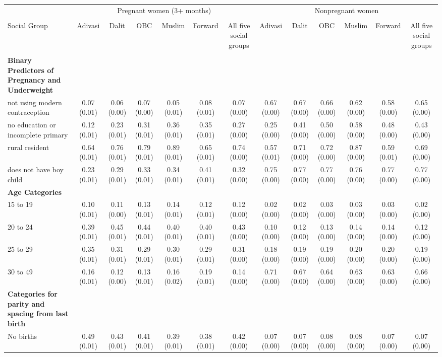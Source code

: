 \begin{tabular}{l*{12}{c}}
\toprule
& \multicolumn{6}{c}{Pregnant women (3+ months)} & \multicolumn{6}{c}{Nonpregnant women} \\\\
\cmidrule(lr){2-7} \cmidrule(lr){8-13}
Social Group & Adivasi & Dalit & OBC & Muslim & Forward & All five social groups & Adivasi & Dalit & OBC & Muslim & Forward & All five social groups \\\\
\midrule
\textbf{Binary Predictors of Pregnancy and Underweight}&&&&&&&&&&&&\\
not using modern contraception&0.07 (0.01)&0.06 (0.00)&0.07 (0.00)&0.05 (0.01)&0.08 (0.01)&0.07 (0.00)&0.67 (0.00)&0.67 (0.00)&0.66 (0.00)&0.62 (0.00)&0.58 (0.00)&0.65 (0.00)\\
no education or incomplete primary&0.12 (0.01)&0.23 (0.01)&0.31 (0.01)&0.36 (0.01)&0.35 (0.01)&0.27 (0.00)&0.25 (0.00)&0.41 (0.00)&0.50 (0.00)&0.58 (0.00)&0.48 (0.00)&0.43 (0.00)\\
rural resident&0.64 (0.01)&0.76 (0.01)&0.79 (0.01)&0.89 (0.01)&0.65 (0.01)&0.74 (0.00)&0.57 (0.01)&0.71 (0.00)&0.72 (0.00)&0.87 (0.00)&0.59 (0.01)&0.69 (0.00)\\
does not have boy child&0.23 (0.01)&0.29 (0.01)&0.33 (0.01)&0.34 (0.01)&0.41 (0.01)&0.32 (0.00)&0.75 (0.00)&0.77 (0.00)&0.77 (0.00)&0.76 (0.00)&0.77 (0.00)&0.77 (0.00)\\
\textbf{Age Categories}&&&&&&&&&&&&\\
15 to 19&0.10 (0.01)&0.11 (0.00)&0.13 (0.01)&0.14 (0.01)&0.12 (0.01)&0.12 (0.00)&0.02 (0.00)&0.02 (0.00)&0.03 (0.00)&0.03 (0.00)&0.03 (0.00)&0.02 (0.00)\\
20 to 24&0.39 (0.01)&0.45 (0.01)&0.44 (0.01)&0.40 (0.01)&0.40 (0.01)&0.43 (0.00)&0.10 (0.00)&0.12 (0.00)&0.13 (0.00)&0.14 (0.00)&0.14 (0.00)&0.12 (0.00)\\
25 to 29&0.35 (0.01)&0.31 (0.01)&0.29 (0.01)&0.30 (0.01)&0.29 (0.01)&0.31 (0.00)&0.18 (0.00)&0.19 (0.00)&0.19 (0.00)&0.20 (0.00)&0.20 (0.00)&0.19 (0.00)\\
30 to 49&0.16 (0.01)&0.12 (0.00)&0.13 (0.01)&0.16 (0.02)&0.19 (0.01)&0.14 (0.00)&0.71 (0.00)&0.67 (0.00)&0.64 (0.00)&0.63 (0.00)&0.63 (0.00)&0.66 (0.00)\\
\textbf{Categories for parity and spacing from last birth}&&&&&&&&&&&&\\
No births&0.49 (0.01)&0.43 (0.01)&0.41 (0.01)&0.39 (0.01)&0.38 (0.01)&0.42 (0.00)&0.07 (0.00)&0.07 (0.00)&0.08 (0.00)&0.08 (0.00)&0.07 (0.00)&0.07 (0.00)\\

\end{tabular}
